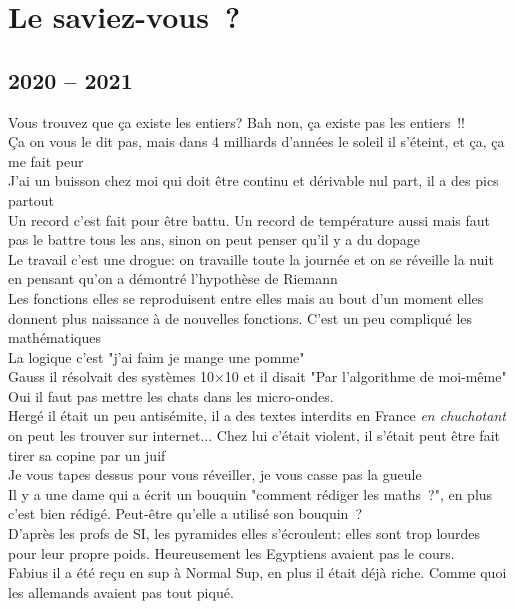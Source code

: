 \documentclass[french, a4paper, openany]{book}
\begin{document}
\section*{Le saviez-vous~?}

	\subsection*{2020 -- 2021}
		\noindent \og Vous trouvez que ça existe les entiers? Bah non, ça existe pas les entiers~!! \fg \\
		\og Ça on vous le dit pas, mais dans 4 milliards d'années le soleil il s'éteint, et ça, ça me fait peur \fg \\
		\og J'ai un buisson chez moi qui doit être continu et dérivable nul part, il a des pics partout \fg \\
		\og Un record c'est fait pour être battu. Un record de température aussi mais faut pas le battre tous les ans, sinon on peut penser qu'il y a du dopage \fg \\
		\og Le travail c'est une drogue: on travaille toute la journée et on se réveille la nuit en pensant qu'on a démontré l'hypothèse de Riemann \fg \\
		\og Les fonctions elles se reproduisent entre elles mais au bout d'un moment elles donnent plus naissance à de nouvelles fonctions. C'est un peu compliqué les mathématiques \fg \\
		\og La logique c'est "j'ai faim je mange une pomme" \fg \\
		\og Gauss il résolvait des systèmes 10×10 et il disait "Par l'algorithme de moi-même" \fg \\
		\og Oui il faut pas mettre les chats dans les micro-ondes. \fg \\
		\og Hergé il était un peu antisémite, il a des textes interdits en France \emph{en chuchotant} on peut les trouver sur internet... Chez lui c'était violent, il s'était peut être fait tirer sa copine par un juif \fg \\
		\og Je vous tapes dessus pour vous réveiller, je vous casse pas la gueule \fg \\
		\og Il y a une dame qui a écrit un bouquin "comment rédiger les maths~?", en plus c'est bien rédigé. Peut-être qu'elle a utilisé son bouquin~? \fg \\
		\og D'après les profs de SI, les pyramides elles s'écroulent: elles sont trop lourdes pour leur propre poids. Heureusement les Egyptiens avaient pas le cours. \fg \\
		\og Fabius il a été reçu en sup à Normal Sup, en plus il était déjà riche. Comme quoi les allemands avaient pas tout piqué. \fg \\
	
\end{document}
